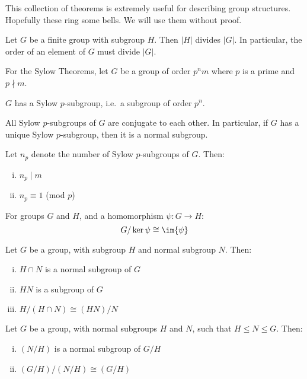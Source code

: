 This collection of theorems is extremely useful for describing group structures.
Hopefully these ring some bells.
We will use them without proof.

\begin{theorem}
    Let \(G\) be a finite group with subgroup \(H\).
    Then \(|H|\) divides \(|G|\).
    In particular, the order of an element of \(G\) must divide \(|G|\).
\end{theorem}

For the Sylow Theorems, let \(G\) be a group of order \(p^n m\) where \(p\) is a prime and \(p\nmid m\).
\begin{theorem}\label{thm:sylow1}
    \(G\) has a Sylow \(p\)-subgroup, i.e.\ a subgroup of order \(p^n\).
\end{theorem}
\begin{theorem}\label{thm:sylow2}
    All Sylow \(p\)-subgroups of \(G\) are conjugate to each other.
    In particular, if \(G\) has a unique Sylow \(p\)-subgroup, then it is a normal subgroup.
\end{theorem}
\begin{theorem}\label{thm:sylow3}
    Let \(n_p\) denote the number of Sylow \(p\)-subgroups of \(G\).
    Then:
    \begin{enumerate}[(i)]
        \item \(n_p \mid m\)
        \item \(n_p\equiv 1\) (mod \(p\))
    \end{enumerate}
\end{theorem}

\begin{theorem}\label{thm:iso1}
    For groups \(G\) and \(H\), and a homomorphism \(\psi:G \to H\):
    \[G / \ker{\psi} \cong \im{\psi}\]
\end{theorem}

\begin{theorem}\label{thm:iso2}
    Let \(G\) be a group, with subgroup \(H\) and normal subgroup \(N\).
    Then:
    \begin{enumerate}[(i)]
        \item \(H \cap N\) is a normal subgroup of \(G\)
        \item \(HN\) is a subgroup of \(G\) 
        \item \(H / (H \cap N) \cong (HN) / N\)
    \end{enumerate}
\end{theorem}

\begin{theorem}\label{thm:iso3}
    Let \(G\) be a group, with normal subgroups \(H\) and \(N\), such that \(H \leqslant N \leqslant G\).
    Then:
    \begin{enumerate}[(i)]
        \item \((N / H)\) is a normal subgroup of \(G / H\)
        \item \((G / H) / (N / H) \cong (G / H)\)
    \end{enumerate}
\end{theorem}
